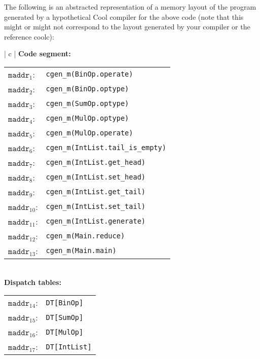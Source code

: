 \documentclass[11pt]{article}
\begin{document}
\begin{enumerate}
  The following is an abstracted representation of a memory layout of the program generated by a hypothetical Cool compiler for the above code (note that this might or might not correspond to the layout generated by your compiler or the reference coolc):
  
  \begin{tabular}{ | c | }
  \hline
  \textbf{Code segment:} \\
  \begin{tabular}{ | R{2cm} | L{9cm} |}
  \hline
  $\mathtt{maddr}_1$: & \texttt{cgen\_m(BinOp.operate)} \\
  $\mathtt{maddr}_2$: & \texttt{cgen\_m(BinOp.optype)} \\
  $\mathtt{maddr}_3$: & \texttt{cgen\_m(SumOp.optype)} \\
  $\mathtt{maddr}_4$: & \texttt{cgen\_m(MulOp.optype)} \\
  $\mathtt{maddr}_5$: & \texttt{cgen\_m(MulOp.operate)} \\
  $\mathtt{maddr}_6$: & \texttt{cgen\_m(IntList.tail\_is\_empty)} \\
  $\mathtt{maddr}_7$: & \texttt{cgen\_m(IntList.get\_head)} \\
  $\mathtt{maddr}_8$: & \texttt{cgen\_m(IntList.set\_head)} \\
  $\mathtt{maddr}_9$: & \texttt{cgen\_m(IntList.get\_tail)} \\
  $\mathtt{maddr}_{10}$: & \texttt{cgen\_m(IntList.set\_tail)} \\
  $\mathtt{maddr}_{11}$: & \texttt{cgen\_m(IntList.generate)} \\
  $\mathtt{maddr}_{12}$: & \texttt{cgen\_m(Main.reduce)} \\
  $\mathtt{maddr}_{13}$: & \texttt{cgen\_m(Main.main)} \\
  \hline
  \end{tabular} \\
  \textbf{Dispatch tables:} \\
  \begin{tabular}{ | R{2cm} | L{9cm} |}
  \hline
  $\mathtt{maddr}_{14}$: & \texttt{DT[BinOp]} \\
  $\mathtt{maddr}_{15}$: & \texttt{DT[SumOp]} \\
  $\mathtt{maddr}_{16}$: & \texttt{DT[MulOp]} \\
  $\mathtt{maddr}_{17}$: & \texttt{DT[IntList]} \\

\end{tabular}
\end{tabular}
\end{enumerate}
\end{document}
